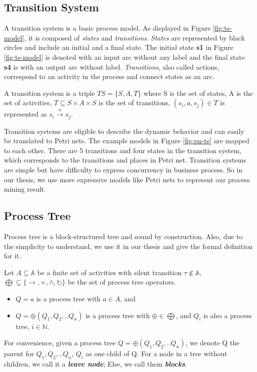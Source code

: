 \subsection{Transition System}
A transition system is a basic process model. As displayed in Figure \ref{fig:ts-model}, it is composed of \emph{states} and \emph{transitions}. \emph{States} are represented by black circles and include an initial and a final state. The initial state \textbf{s1} in Figure \ref{fig:ts-model} is denoted with an input arc without any label and the final state \textbf{s4} is with an output arc without label. \emph{Transitions}, also called actions, correspond to an activity in the process and connect states as an arc.  
\begin{definition}
	A transition system is a triple $TS=\{S,A,T\}$ where S is the set of states, A is the set of activities, $T \subseteq S\times A\times S $ is the set of transitions, $(s_i, a, s_j) \in T$ is represented as $s_i \xrightarrow{a} s_j$.  
\end{definition}
Transition systems are eligible to describe the dynamic behavior and can easily be translated to Petri nets. The example models in Figure \ref{fig:pn-ts} are mapped to each other. There are 5 transitions and four states in the transition system, which corresponds to the transitions and places in Petri net. Transition systems are simple but have difficulty to express concurrency in business process. So in our thesis, we use more expressive models like Petri nets to represent our process mining result.

\subsection{Process Tree}
Process tree is a block-structured tree and sound by construction\cite{van2016data}. Also, due to the simplicity to understand, we use it in our thesis and give the formal definition for it.
\begin{definition}
Let $ A \subseteq \mathbb{A} $ be a finite set of activities with silent transition $\tau \notin \mathbb{A}$, $\bigoplus \subseteq \{\rightarrow, \times, \land, \circlearrowright\}$ be the set of process tree operators. 
\begin{itemize}
\item $Q=a$ is a process tree with $a\in A$, and 
\item $Q= \oplus (Q_1 , Q_2 ,.. Q_n)$ is a process tree with $\oplus \in \bigoplus$, and $Q_i$ is also a process tree, $i \in \mathbb{N}$. 
\end{itemize}
\end{definition}
For convenience, given a process tree $Q= \oplus (Q_1 , Q_2 ,.. Q_n)$, we denote Q the parent for $Q_1 , Q_2 ,.. Q_n$, $Q_i$ as one child of Q. For a node in a tree without children, we call it a \textbf{\emph{leave node}}; Else, we call them \textbf{\emph{blocks}}.


